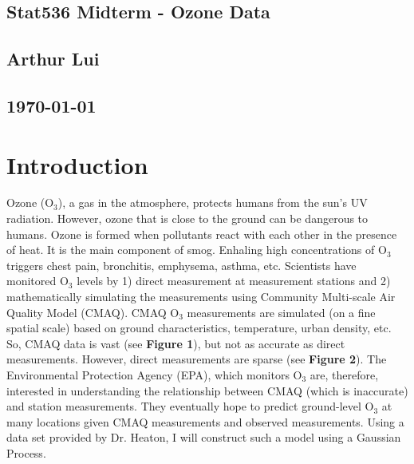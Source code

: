 \documentclass{article}                                                   %
\begin{document}
\begin{center}                                                            %
  \section*{\textbf{Stat536 Midterm - Ozone Data}}                        %
  \subsection*{\textbf{Arthur Lui}}                                       %
  \subsection*{\noindent\today}                                           %
\end{center}                                                              %

\section{Introduction}
  Ozone (O$_3$), a gas in the atmosphere, protects humans from the sun's UV
  radiation. However, ozone that is close to the ground can be dangerous to
  humans. Ozone is formed when pollutants react with each other in the presence
  of heat. It is the main component of smog. Enhaling high concentrations of
  O$_3$ triggers chest pain, bronchitis, emphysema, asthma, etc. Scientists have
  monitored O$_3$ levels by 1) direct measurement at measurement stations and 2)
  mathematically simulating the measurements using Community Multi-scale Air
  Quality Model (CMAQ). CMAQ O$_3$ measurements are simulated (on a fine spatial
  scale) based on ground characteristics, temperature, urban density, etc.  So,
  CMAQ data is vast (see \textbf{Figure 1}), but not as accurate as direct
  measurements. However, direct measurements are sparse (see \textbf{Figure 2}).
  The Environmental Protection Agency (EPA), which monitors O$_3$ are,
  therefore, interested in understanding the relationship between CMAQ (which is
  inaccurate) and station measurements. They eventually hope to predict
  ground-level O$_3$ at many locations given CMAQ measurements and observed
  measurements. Using a data set provided by Dr.  Heaton, I will construct such
  a model using a Gaussian Process.
\end{document}
